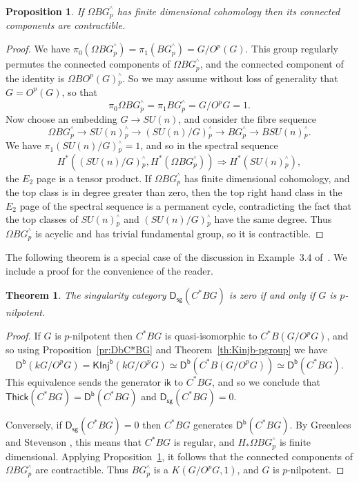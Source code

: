 \documentclass[12pt]{amsart}
\newcommand{\DD}{\mathsf{D}}%
\newcommand{\Db}{\DD^{\mathsf{b}}}%
\newcommand{\Dsg}{\DD_{\mathsf{sg}}}%
\newcommand{\ik}{\mathsf{ik}}
\newcommand{\kG}{\kk G}
\newcommand{\kk}{k}
\newcommand{\KInj}{\mathsf{KInj}}
\newcommand{\KInjb}{\KInj^{\mathsf{b}}}
\newcommand{\phat}{{}^{^\wedge}_p}
\newcommand{\Thick}{\mathsf{Thick}}
\numberwithin{equation}{section}
\theoremstyle{plain}
\newtheorem{theorem}[equation]{Theorem}
\newtheorem{proposition}[equation]{Proposition}
\theoremstyle{definition}
\theoremstyle{remark}
\begin{document}
\begin{proposition}\label{pr:Fred}
If $\Omega BG\phat$ has finite dimensional cohomology then its
connected components are contractible.
\end{proposition}
\begin{proof}
We have $\pi_0(\Omega BG\phat)=\pi_1(BG\phat)=G/O^p(G)$. This group
regularly permutes the connected components of $\Omega BG\phat$, and
the connected component of the identity is $\Omega BO^p(G)\phat$. So
we may assume without loss of generality that $G=O^p(G)$, so that
\[ \pi_0\Omega BG\phat=\pi_1 BG\phat=G/O^pG=1. \]
Now choose an embedding
$G\to SU(n)$, and consider the fibre sequence
\[ \Omega BG\phat \to SU(n)\phat \to (SU(n)/G)\phat \to BG\phat \to
  BSU(n)\phat. \]
We have $\pi_1(SU(n)/G)\phat=1$, and so in the spectral sequence
\[ H^*((SU(n)/G)\phat,H^*(\Omega BG\phat)) \Rightarrow
  H^*(SU(n)\phat), \]
the $E_2$ page is a tensor product.
If $\Omega BG\phat$ has finite
dimensional cohomology, and the top class is in degree greater than
zero,  then the top right hand class in the $E_2$ page of the spectral
sequence is a permanent cycle, contradicting the fact that the top
classes of $SU(n)\phat$ and $(SU(n)/G)\phat$ have the same degree.
Thus $\Omega BG\phat$ is acyclic and has trivial fundamental group, so
it is contractible.
\end{proof}

The following theorem is a special case of the discussion in
Example~3.4 of~\cite{Greenlees/Stevenson:2020a}. We include a proof
for the convenience of the reader.

\begin{theorem}\label{th:Dsg=0}
The singularity category $\Dsg(C^*BG)$ is zero if and only if $G$ is
$p$-nilpotent. 
\end{theorem}
\begin{proof}
If $G$ is $p$-nilpotent then $C^*BG$ is quasi-isomorphic to
$C^*B(G/O^pG)$, and so using Proposition~\ref{pr:DbC*BG} and
Theorem~\ref{th:Kinjb-pgroup} we have
\[ \Db(\kG/O^pG)=\KInjb(\kG/O^pG)\simeq\Db(C^*B(G/O^pG))\simeq\Db(C^*BG). \]
This equivalence sends the generator $\ik$
to $C^*BG$, and so we conclude that $\Thick(C^*BG)=\Db(C^*BG)$ and
$\Dsg(C^*BG)=0$.

Conversely, if $\Dsg(C^*BG)=0$ then $C^*BG$ generates
$\Db(C^*BG)$. By Greenlees and Stevenson
\cite[Example~3.4]{Greenlees/Stevenson:2020a}, this means that $C^*BG$
is regular, and $H_*\Omega BG\phat$ is finite dimensional.
Applying Proposition~\ref{pr:Fred}, it follows that the connected
components of $\Omega BG\phat$ are contractible. Thus $BG\phat$ is a
$K(G/O^pG,1)$, and $G$ is $p$-nilpotent.
\end{proof}
\end{document}
